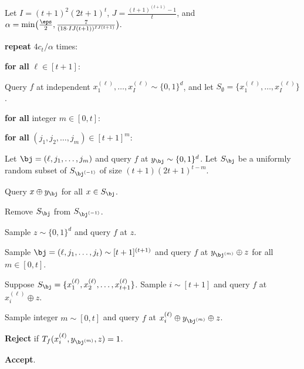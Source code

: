 \documentclass{toc}
\begin{document}
\begin{algorithm} %
	\caption{A $t$-Online-Erasure-Resilient Quadraticity Tester}
	\begin{algorithmic}[1]
	
		
		\State Let $I = (t+1)^{2}(2t+1)^t$, $J = \frac{(t+1)^{(t+1)}-1}{t}$, and  $\alpha =  \min \bigl( \frac{\eps}{2}, \frac{7}{(18 \cdot IJ(t+1))^{I J (t+1)}} \bigr).$
		\label{step:def_constants}
		
		\State\textbf{repeat} $4c_t/\alpha$ times: 
		
		\State \indent \textbf{for all} $\ell \in [t+1]$:
		
		\State \indent \indent Query $f$ at independent $x_1^{(\ell)}, \dots, x_I^{(\ell)} \sim \{0,1\}^d$, and let $S_\emptyset = \{x_1^{(\ell)}, \dots, x_I^{(\ell)}\}$. \label{step:query_y}
		
		\State \indent \indent   \textbf{for all} integer $m \in [0,t]$:

		\State \indent  \indent \indent   \textbf{for all} $(j_1, j_2, \dots, j_m) \in [t+1]^{m}$:  \label{step:query_x}
		
		\State \indent \indent \indent  \indent Let $\bj = (\ell, j_1, \dots, j_m)$ and query $f$ at $y_{\bj}  \sim \{0,1\}^d$. 
%
%
		\State \indent \indent \indent  \indent Let $S_{\bj}$ be a uniformly random subset of $S_{\bj^{(-1)}}$ of size $(t+1)(2t+1)^{t-m}$. \label{step:random_subset}
		
		\State \indent \indent \indent  \indent Query $x \oplus y_{\bj}$ for all $x \in S_{\bj}$. \label{step:query_xy}
		
		\State \indent \indent \indent  \indent Remove $S_{\bj}$ from $S_{\bj^{(-1)}}$. 
		
	
		\State \indent Sample $z \sim \{0,1\}^d$ and query $f$ at $z$.  \label{step:query_z}
		
		\State \indent Sample $\bj = (\ell, j_1, \dots, j_{t}) \sim [t+1]^{(t+1)}$ and query $f$ at $y_{\bj^{(m)}}   \oplus z$ for all $m \in [0,t]$. \label{step:query_indices}
		
		
		\State \indent Suppose $S_{\bj}   = \{x_1^{(\ell)}, x_2^{(\ell)}, \dots, x_{t+1}^{(\ell)}\}$.  Sample $i \sim [t+1]$ and query $f$ at $x_i^{(\ell)} \oplus z$.

		\label{step:query_zy}
		
		\State \indent Sample integer $m \sim [0,t]$ and query $f$ at $x_{i}^{(\ell)} \oplus y_{\bj^{(m)}}   \oplus  z$.\label{step:3sum}
		
	
		\State \indent \textbf{Reject} if $T_f(x_{i}^{(\ell)}, y_{\bj^{(m)}} , z) = 1$. 
		
		\State \textbf{Accept}. 
	\end{algorithmic}
	\label{alg:quadratic_t}
\end{algorithm}
\end{document}

